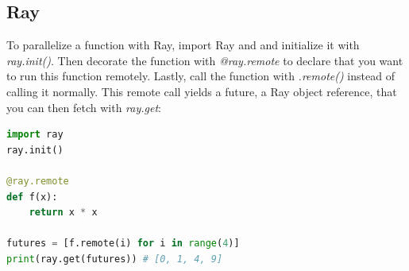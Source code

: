 \subsection{Ray}
To parallelize a function with Ray, import Ray and and initialize it with \textit{ray.init()}. Then decorate the function with \textit{@ray.remote} to declare that you want to run this function remotely. Lastly, call the function with \textit{.remote()} instead of calling it normally. This remote call yields a future, a Ray object reference, that you can then fetch with \textit{ray.get}:

\begin{lstlisting}[language=Python]
import ray
ray.init()

@ray.remote
def f(x):
    return x * x

futures = [f.remote(i) for i in range(4)]
print(ray.get(futures)) # [0, 1, 4, 9]
    \end{lstlisting}

